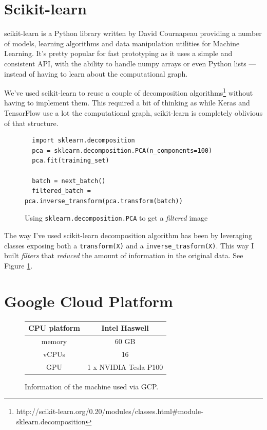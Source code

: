 \section{Scikit-learn}
\label{sec:sklearn}

scikit-learn is a Python library written by David Cournapeau providing
a number of models, learning algorithms and data manipulation utilities
for Machine Learning. It's pretty popular for fast prototyping as it
uses a simple and consistent API, with the ability to handle numpy
arrays or even Python lists --- instead of having to learn about the
computational graph.

We've used scikit-learn to reuse a couple of decomposition
algorithms\footnote{http://scikit-learn.org/0.20/modules/classes.html\#module-sklearn.decomposition}
without having to implement them. This required a bit of thinking as
while Keras and TensorFlow use a lot the computational graph,
scikit-learn is completely oblivious of that structure.

\begin{figure}
  \begin{verbatim}
  import sklearn.decomposition
  pca = sklearn.decomposition.PCA(n_components=100)
  pca.fit(training_set)

  batch = next_batch()
  filtered_batch = pca.inverse_transform(pca.transform(batch))
  \end{verbatim}
  \caption{Using \texttt{sklearn.decomposition.PCA} to get a
    \emph{filtered} image}
  \label{fig:transform-inverse_transform}
\end{figure}

The way I've used scikit-learn decomposition algorithm has been by
leveraging classes exposing both a \texttt{transform(X)} and a
\texttt{inverse\_trasform(X)}. This way I built \emph{filters} that
\emph{reduced} the amount of information in the original data. See
Figure \ref{fig:transform-inverse_transform}.

\section{Google Cloud Platform}
\label{sec:google-cloud-platform}

\begin{figure}
  \centering
  \begin{tabular}{|c|c|}
    \hline
    CPU platform & Intel Haswell \\
    \hline
    memory & 60 GB \\
    \hline
    vCPUs & 16 \\
    \hline
    GPU & 1 x NVIDIA Tesla P100 \\
    \hline
  \end{tabular}
  \caption{Information of the machine used via GCP.}
  \label{fig:expensive-machine}
\end{figure}

